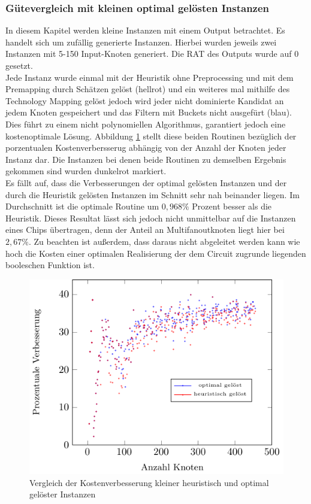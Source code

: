 \documentclass[11pt, a4paper, german]{article}
\newcommand{\TM}{Technology  Mapping }
\begin{document}
\subsubsection{Gütevergleich mit kleinen optimal gel\"osten Instanzen}
\label{subsubsec:guetevgl_kleiner_opt_instanzen}
In diesem Kapitel werden kleine Instanzen mit einem Output betrachtet. Es handelt sich um zuf\"allig generierte Instanzen. Hierbei wurden jeweils zwei Instanzen mit 5-150 Input-Knoten generiert. Die RAT des Outputs wurde auf $0$ gesetzt.\\
Jede Instanz wurde einmal mit der Heuristik ohne Preprocessing und mit dem Premapping durch Sch\"atzen gel\"ost (hellrot) und ein weiteres mal mithilfe des \TM gel\"ost jedoch wird jeder nicht dominierte Kandidat an jedem Knoten gespeichert und das Filtern mit Buckets nicht ausgef\"urt (blau). Dies f\"uhrt zu einem nicht polynomiellen Algorithmus, garantiert jedoch eine kostenoptimale L\"osung. Abbildung \ref{bild:small_opt_test} stellt diese beiden Routinen bez\"uglich der porzentualen Kostenverbersserug abh\"angig von der Anzahl der Knoten jeder Instanz dar.
Die Instanzen bei denen beide Routinen zu demselben Ergebnis gekommen sind wurden dunkelrot markiert.\\
Es f\"allt auf, dass die Verbesserungen der optimal gel\"osten Instanzen und der durch die Heuristik gel\"osten Instanzen im Schnitt sehr nah beinander liegen. Im Durchschnitt ist die optimale Routine um $0,968\%$ Prozent besser als die Heuristik. Dieses Resultat l\"asst sich jedoch nicht unmittelbar auf die Instanzen eines Chips \"ubertragen, denn der Anteil an Multifanoutknoten liegt hier bei $2,67\%$. Zu beachten ist au{\ss}erdem, dass daraus nicht abgeleitet werden kann wie hoch die Kosten einer optimalen  Realisierung der dem Circuit zugrunde liegenden booleschen Funktion ist.\\
\begin{figure}[h]
		\centering
		\includegraphics[width = 12.5cm]{pictures/tex_files/analysis/small_opt_test}
		\caption{Vergleich der Kostenverbesserung kleiner heuristisch und optimal gel\"oster Instanzen }
		\label{bild:small_opt_test}
\end{figure}
\end{document}
